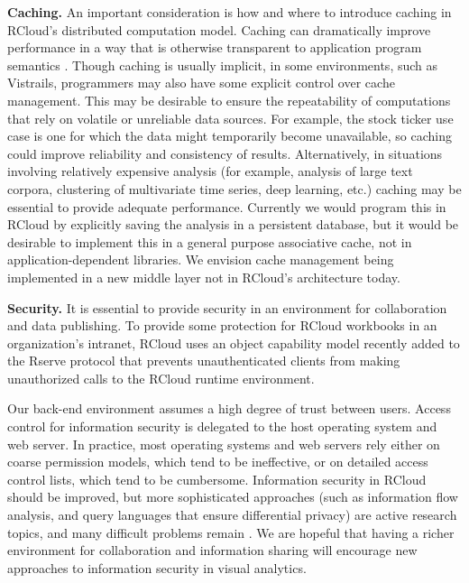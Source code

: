 
{\bf Caching.}
An important consideration is how and where to introduce caching
in RCloud's distributed computation model. Caching can dramatically
improve performance in a way that is otherwise transparent to
application program semantics \cite{Callahan:2006:VVM, Guo:2010:TPI}.
Though caching is usually implicit, in some environments, such as
Vistrails, programmers may also have some explicit control over cache
management. This may be desirable to ensure the repeatability of
computations that rely on volatile or unreliable data sources.
For example, the stock ticker use case is one for which the data
might temporarily become unavailable, so caching could improve
reliability and consistency of results.  Alternatively, in situations
involving relatively expensive analysis (for example, analysis of large
text corpora, clustering of multivariate time series, deep learning, etc.)
caching may be essential to provide adequate performance. Currently we would
program this in RCloud by explicitly saving the analysis in a persistent database,
but it would be desirable to implement this in a general purpose associative
cache, not in application-dependent libraries.  We envision cache management
being implemented in a new middle layer not in RCloud's architecture today.

{\bf Security.}
It is essential to provide security in an environment for
collaboration and data publishing. To provide some
protection for RCloud workbooks in an organization's intranet,
RCloud uses an object capability model
\cite{Miller:2006:RCT}
recently added to the Rserve protocol \cite{Urbanek:2003:AFW}
that prevents unauthenticated clients from making
unauthorized calls to the RCloud runtime environment.

Our back-end environment assumes a high degree of trust between users.
Access control for information security is delegated to the host
operating system and web server. In practice, most operating
systems and web servers rely either on coarse permission models,
which tend to be ineffective, or on detailed access control
lists, which tend to be cumbersome. 
Information security in RCloud should be improved, but more
sophisticated approaches (such as information flow analysis,
and query languages that ensure differential privacy) are
active research topics, and many difficult problems remain
\cite{Moore:2011:SAF}. We are hopeful that having a richer
environment for collaboration and information sharing will encourage
new approaches to information security in visual analytics.
